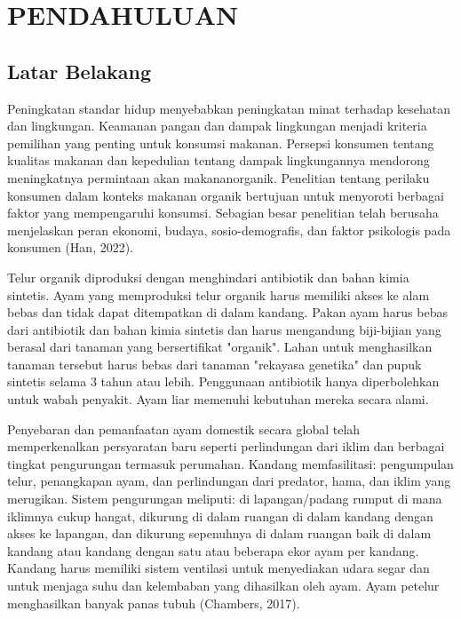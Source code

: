 
\chapter{PENDAHULUAN}

\section{Latar Belakang}
\par Peningkatan standar hidup menyebabkan peningkatan minat terhadap kesehatan dan lingkungan. Keamanan pangan dan dampak lingkungan menjadi kriteria pemilihan yang penting untuk konsumsi makanan. Persepsi konsumen tentang kualitas makanan dan kepedulian tentang dampak lingkungannya mendorong meningkatnya permintaan akan makananorganik. Penelitian tentang perilaku konsumen dalam konteks makanan organik bertujuan untuk menyoroti berbagai faktor yang mempengaruhi konsumsi. Sebagian besar penelitian telah berusaha menjelaskan peran ekonomi, budaya, sosio-demografis, dan faktor psikologis pada konsumen (Han, 2022).
\par Telur organik diproduksi dengan menghindari antibiotik dan bahan kimia sintetis. Ayam yang memproduksi telur organik harus memiliki akses ke alam bebas dan tidak dapat ditempatkan di dalam kandang. Pakan ayam harus bebas dari antibiotik dan bahan kimia sintetis dan harus mengandung biji-bijian yang berasal dari tanaman yang bersertifikat "organik". Lahan untuk menghasilkan tanaman tersebut harus bebas dari tanaman "rekayasa genetika" dan pupuk sintetis selama 3 tahun atau lebih. Penggunaan antibiotik hanya diperbolehkan untuk wabah penyakit. Ayam liar memenuhi kebutuhan mereka secara alami.
\par Penyebaran dan pemanfaatan ayam domestik secara global telah memperkenalkan persyaratan baru seperti perlindungan dari iklim dan berbagai tingkat pengurungan termasuk perumahan. Kandang memfasilitasi: pengumpulan telur, penangkapan ayam, dan perlindungan dari predator, hama, dan iklim yang merugikan. Sistem pengurungan meliputi: di lapangan/padang rumput di mana iklimnya cukup hangat, dikurung di dalam ruangan di dalam kandang dengan akses ke lapangan, dan dikurung sepenuhnya di dalam ruangan baik di dalam kandang atau kandang dengan satu atau beberapa ekor ayam per kandang. Kandang harus memiliki sistem ventilasi untuk menyediakan udara segar dan untuk menjaga suhu dan kelembaban yang dihasilkan oleh ayam. Ayam petelur menghasilkan banyak panas tubuh (Chambers, 2017).

